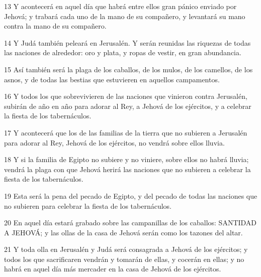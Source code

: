 \par 13 Y acontecerá en aquel día que habrá entre ellos gran pánico enviado por Jehová; y trabará cada uno de la mano de su compañero, y levantará su mano contra la mano de su compañero.
\par 14 Y Judá también peleará en Jerusalén. Y serán reunidas las riquezas de todas las naciones de alrededor: oro y plata, y ropas de vestir, en gran abundancia.
\par 15 Así también será la plaga de los caballos, de los mulos, de los camellos, de los asnos, y de todas las bestias que estuvieren en aquellos campamentos.
\par 16 Y todos los que sobrevivieren de las naciones que vinieron contra Jerusalén, subirán de año en año para adorar al Rey, a Jehová de los ejércitos, y a celebrar la fiesta de los tabernáculos. 
\par 17 Y acontecerá que los de las familias de la tierra que no subieren a Jerusalén para adorar al Rey, Jehová de los ejércitos, no vendrá sobre ellos lluvia.
\par 18 Y si la familia de Egipto no subiere y no viniere, sobre ellos no habrá lluvia; vendrá la plaga con que Jehová herirá las naciones que no subieren a celebrar la fiesta de los tabernáculos.
\par 19 Esta será la pena del pecado de Egipto, y del pecado de todas las naciones que no subieren para celebrar la fiesta de los tabernáculos.
\par 20 En aquel día estará grabado sobre las campanillas de los caballos: SANTIDAD A JEHOVÁ; y las ollas de la casa de Jehová serán como los tazones del altar.
\par 21 Y toda olla en Jerusalén y Judá será consagrada a Jehová de los ejércitos; y todos los que sacrificaren vendrán y tomarán de ellas, y cocerán en ellas; y no habrá en aquel día más mercader en la casa de Jehová de los ejércitos.

